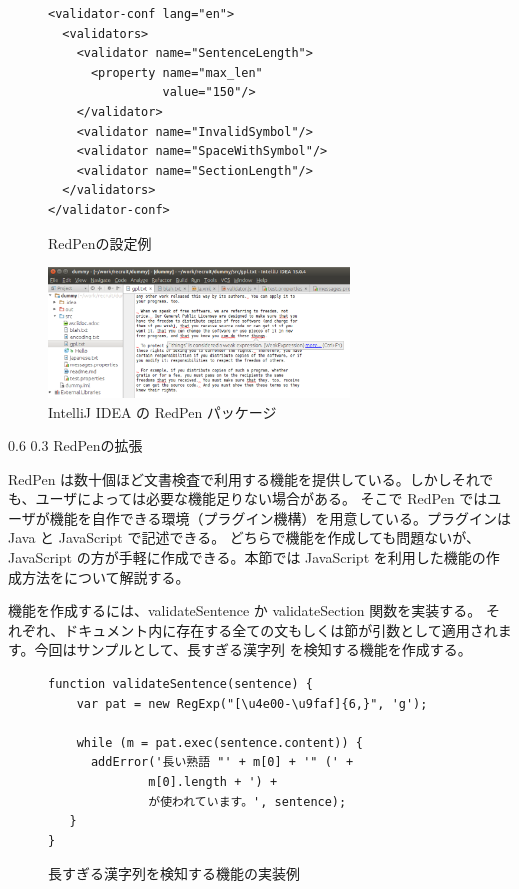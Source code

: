 \documentclass[a4j,twocolumn]{jarticle}
\makeatletter
\def\section{\@startsection{section}{1}{\z@}%
   {0.6\Cvs}%
   {0.3\Cvs}%
   {\reset@font\fontsize{10.5pt}{0pt}\bfseries}}
\makeatother
\begin{document}
\begin{figure}
  \scriptsize
  \small
  \begin{verbatim}
<validator-conf lang="en">
  <validators>
    <validator name="SentenceLength">
      <property name="max_len"
                value="150"/>
    </validator>
    <validator name="InvalidSymbol"/>
    <validator name="SpaceWithSymbol"/>
    <validator name="SectionLength"/>
  </validators>
</validator-conf>
  \end{verbatim}
  \normalsize
  \caption{RedPenの設定例}
  \label{fig:conf}
\end{figure}

\begin{figure}[thbp]
  \begin{center}
    \includegraphics[width=8cm]{figs/intellij.eps}
  \end{center}
  \caption{IntelliJ IDEA の RedPen パッケージ}
  \label{fig:intellij-idea}
\end{figure}  

\section{RedPenの拡張}
\label{sec:extension}

RedPen は数十個ほど文書検査で利用する機能を提供している。しかしそれでも、ユーザによっては必要な機能足りない場合がある。
そこで RedPen ではユーザが機能を自作できる環境（プラグイン機構）を用意している。プラグインは Java と JavaScript で記述できる。
どちらで機能を作成しても問題ないが、JavaScript の方が手軽に作成できる。本節では JavaScript を利用した機能の作成方法をについて解説する。

機能を作成するには、validateSentence か validateSection 関数を実装する。
それぞれ、ドキュメント内に存在する全ての文もしくは節が引数として適用されます。今回はサンプルとして、長すぎる漢字列
を検知する機能を作成する。

\begin{figure}
  \scriptsize
  \small
  \begin{verbatim}
function validateSentence(sentence) {
    var pat = new RegExp("[\u4e00-\u9faf]{6,}", 'g');

    while (m = pat.exec(sentence.content)) {
      addError('長い熟語 "' + m[0] + '" (' +
              m[0].length + ') +
              が使われています。', sentence);
   }
}
  \end{verbatim}
  \normalsize
  \caption{長すぎる漢字列を検知する機能の実装例}
  \label{fig:js-validator}
\end{figure}
\end{document}
